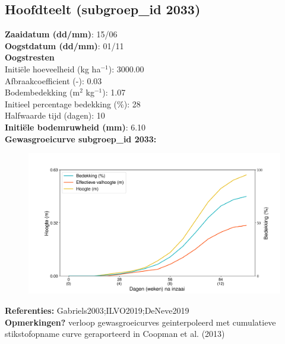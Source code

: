 \documentclass{article}
\begin{document}
 \subsection{Hoofdteelt (subgroep\_id 2033)} 
  \textbf{Zaaidatum (dd/mm)}: 15/06  \vspace{0.10cm} \\ 
  \textbf{Oogstdatum (dd/mm)}: 01/11  \vspace{0.10cm} \\ 
  \textbf{Oogstresten} \vspace{0.05cm} \\ 
  \tab Initi\"{e}le hoeveelheid (kg ha$^{-1}$): 3000.00 \vspace{0.05cm} \\ 
  \tab Afbraakcoefficient (-): 0.03 \vspace{0.05cm} \\ 
  \tab Bodembedekking (m$^2$ kg$^{-1}$): 1.07 \vspace{0.05cm} \\ 
  \tab Initieel percentage bedekking (\%): 28 \vspace{0.05cm} \\ 
  \tab Halfwaarde tijd (dagen): 10 \vspace{0.05cm} \\ 
  \textbf{Initi\"{e}le bodemruwheid (mm)}: 6.10 \vspace{0.05cm} \\ 
  \textbf{Gewasgroeicurve subgroep\_id 2033:} 
 \begin{center} \begin{figure}[H] \includegraphics[width=12.5cm]{temp/2033.png} \end{figure} \end{center} 
  \textbf{Referenties:} Gabriels2003;ILVO2019;DeNeve2019 \vspace{0.10cm} \\ 
  \textbf{Opmerkingen?} verloop gewasgroeicurves geinterpoleerd met cumulatieve stikstofopname curve geraporteerd in Coopman et al. (2013) \vspace{0.10cm} \\ 
 \newpage 
\end{document}

